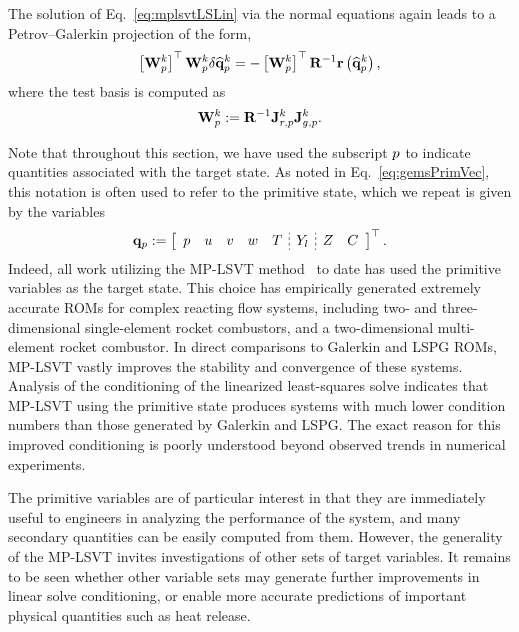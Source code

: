 The solution of Eq.~\ref{eq:mplsvtLSLin} via the normal equations again leads to a Petrov--Galerkin projection of the form,
%
\begin{equation}
    \left[\testBasisPrim^\newtonIdx\right]^\top \testBasisPrim^{\newtonIdx} \delta \primVecCoef^{\newtonIdx} = - \left[\testBasisPrim^{\newtonIdx}\right]^\top \resScaleInv \resFunc{\primVecCoef^{\newtonIdx}},
\end{equation}
%
where the test basis is computed as
%
\begin{equation}
    \testBasisPrim^{\newtonIdx} \defEq \resScaleInv \jacobResPrim^{\newtonIdx} \jacobDecodePrim^{\newtonIdx}.
\end{equation}
%

Note that throughout this section, we have used the subscript $p$ to indicate quantities associated with the target state. As noted in Eq.~\ref{eq:gemsPrimVec}, this notation is often used to refer to the primitive state, which we repeat is given by the variables
%
\begin{equation}
    \primVec \defEq \left[
    \begin{array}{ccccc;{2pt/2pt}c;{2pt/2pt}cc}
    \pressure & \velX & \velY & \velZ & \temperature & \mfSpec & \mixFrac & \progVar
    \end{array}
    \right]^\top.
\end{equation}
%
Indeed, all work utilizing the MP-LSVT method~\cite{Huang2022,Wentland2021,Huang2022a} to date has used the primitive variables as the target state. This choice has empirically generated extremely accurate ROMs for complex reacting flow systems, including two- and three-dimensional single-element rocket combustors, and a two-dimensional multi-element rocket combustor. In direct comparisons to Galerkin and LSPG ROMs, MP-LSVT vastly improves the stability and convergence of these systems. Analysis of the conditioning of the linearized least-squares solve indicates that MP-LSVT using the primitive state produces systems with much lower condition numbers than those generated by Galerkin and LSPG. The exact reason for this improved conditioning is poorly understood beyond observed trends in numerical experiments.

The primitive variables are of particular interest in that they are immediately useful to engineers in analyzing the performance of the system, and many secondary quantities can be easily computed from them. However, the generality of the MP-LSVT invites investigations of other sets of target variables. It remains to be seen whether other variable sets may generate further improvements in linear solve conditioning, or enable more accurate predictions of important physical quantities such as heat release.